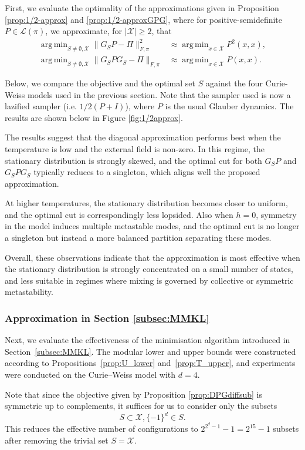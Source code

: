 \documentclass[EJP]{ejpecp} %
\DeclareMathOperator*{\argmin}{arg\,min}
\begin{document}
First, we evaluate the optimality of the approximations given in Proposition \ref{prop:1/2-approx} and \ref{prop:1/2-approxGPG}, where for positive-semidefinite $P \in \mathcal{L}(\pi)$, we approximate, for $|\mathcal{X}| \geq 2$, that
\begin{align*}
    \argmin_{S \neq \emptyset, \mathcal{X}} \|G_SP - \Pi\|_{F, \pi}^2 &\approx \argmin_{x \in \mathcal{X}} P^2(x,x),\\
    \argmin_{S \neq \emptyset, \mathcal{X}} \|G_SPG_S - \Pi\|_{F, \pi} &\approx \argmin_{x \in \mathcal{X}} P(x,x).
\end{align*}

Below, we compare the objective and the optimal set $S$ against the four Curie-Weiss models used in the previous section. Note that the sampler used is now a lazified sampler (i.e. $1/2(P+I)$), where $P$ is the usual Glauber dynamics. The results are shown below in Figure \ref{fig:1/2approx}.

The results suggest that the diagonal approximation performs best when the temperature is low and the external field is non-zero. In this regime, the stationary distribution is strongly skewed, and the optimal cut for both $G_SP$ and $G_SPG_S$ typically reduces to a singleton, which aligns well the proposed approximation.

At higher temperatures, the stationary distribution becomes closer to uniform, and the optimal cut is correspondingly less lopsided. Also when $h=0$, symmetry in the model induces multiple metastable modes, and the optimal cut is no longer a singleton but instead a more balanced partition separating these modes. 

Overall, these observations indicate that the approximation is most effective when the stationary distribution is strongly concentrated on a small number of states, and less suitable in regimes where mixing is governed by collective or symmetric metastability. 

\subsubsection{Approximation in Section \ref{subsec:MMKL}} \label{}
Next, we evaluate the effectiveness of the minimisation algorithm introduced in Section~\ref{subsec:MMKL}. The modular lower and upper bounds were constructed according to Propositions~\ref{prop:U_lower} and~\ref{prop:T_upper}, and experiments were conducted on the Curie–Weiss model with $d=4$.

Note that since the objective given by Proposition \ref{prop:DPGdiffsub} is symmetric up to complements, it suffices for us to consider only the subsets
$$S \subset \mathcal{X}, \{-1\}^d \in S.$$
This reduces the effective number of configurations to $2^{2^d-1}-1 = 2^{15}-1$ subsets after removing the trivial set $S = \mathcal{X}$. 
\end{document}
